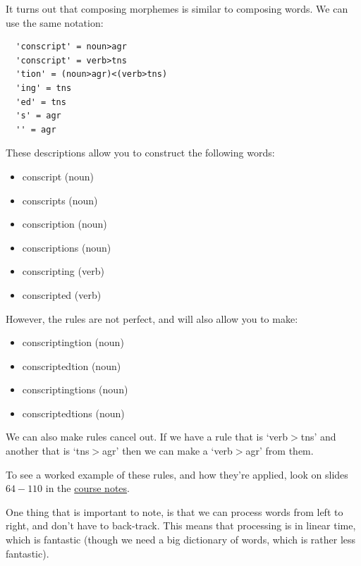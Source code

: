 It turns out that composing morphemes is similar to composing words. We can use the same notation:

\begin{verbatim}
  'conscript' = noun>agr
  'conscript' = verb>tns
  'tion' = (noun>agr)<(verb>tns)
  'ing' = tns
  'ed' = tns
  's' = agr
  '' = agr
\end{verbatim}

These descriptions allow you to construct the following words:

\begin{mymulticols}
  \begin{itemize}
    \item conscript (noun)
    \item conscripts (noun)
    \item conscription (noun)
    \item conscriptions (noun)
    \item conscripting (verb)
    \item conscripted (verb)
  \end{itemize}
\end{mymulticols}

However, the rules are not perfect, and will also allow you to make:

\begin{mymulticols}
  \begin{itemize}
    \item conscriptingtion (noun)
    \item conscriptedtion (noun)
    \item conscriptingtions (noun)
    \item conscriptedtions (noun)
  \end{itemize}
\end{mymulticols}

We can also make rules cancel out. If we have a rule that is `verb$>$tns' and
another that is `tns$>$agr' then we can make a `verb$>$agr' from them.

To see a worked example of these rules, and how they're applied, look on slides
$64-110$ in the
\href{http://studentnet.cs.manchester.ac.uk/ugt/2015/COMP34411/COMP34411.pdf}
{course notes}.

One thing that is important to note, is that we can process words from left to
right, and don't have to back-track. This means that processing is in linear
time, which is fantastic (though we need a big dictionary of words, which is
rather less fantastic).
